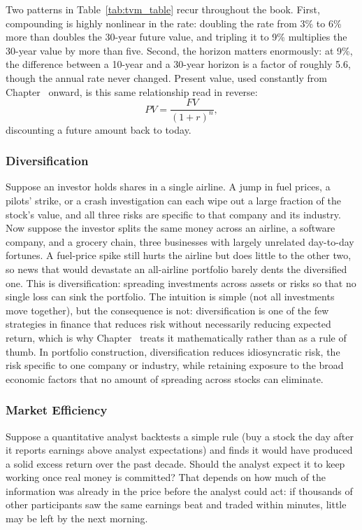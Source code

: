 \documentclass[../ai_in_finance]{subfiles}
\begin{document}
Two patterns in Table~\ref{tab:tvm_table} recur throughout the book. First, compounding is highly nonlinear in the rate: doubling the rate from 3\% to 6\% more than doubles the 30-year future value, and tripling it to 9\% multiplies the 30-year value by more than five. Second, the horizon matters enormously: at 9\%, the difference between a 10-year and a 30-year horizon is a factor of roughly 5.6, though the annual rate never changed. Present value, used constantly from Chapter~ onward, is this same relationship read in reverse:
$$PV = \frac{FV}{(1+r)^n},$$
discounting a future amount back to today.

\subsubsection*{Diversification}

Suppose an investor holds shares in a single airline. A jump in fuel prices, a pilots' strike, or a crash investigation can each wipe out a large fraction of the stock's value, and all three risks are specific to that company and its industry. Now suppose the investor splits the same money across an airline, a software company, and a grocery chain, three businesses with largely unrelated day-to-day fortunes. A fuel-price spike still hurts the airline but does little to the other two, so news that would devastate an all-airline portfolio barely dents the diversified one.
This is diversification: spreading investments across assets or risks so that no single loss can sink the portfolio. The intuition is simple (not all investments move together), but the consequence is not: diversification is one of the few strategies in finance that reduces risk without necessarily reducing expected return, which is why Chapter~ treats it mathematically rather than as a rule of thumb. In portfolio construction, diversification reduces idiosyncratic risk, the risk specific to one company or industry, while retaining exposure to the broad economic factors that no amount of spreading across stocks can eliminate.

\subsubsection*{Market Efficiency}

Suppose a quantitative analyst backtests a simple rule (buy a stock the day after it reports earnings above analyst expectations) and finds it would have produced a solid excess return over the past decade. Should the analyst expect it to keep working once real money is committed? That depends on how much of the information was already in the price before the analyst could act: if thousands of other participants saw the same earnings beat and traded within minutes, little may be left by the next morning.
\end{document}
